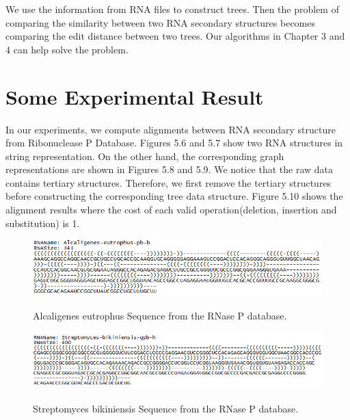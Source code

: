 We use the information from RNA files to construct trees. Then the problem of comparing the similarity between two RNA secondary structures becomes comparing the edit distance between two trees. Our algorithms in Chapter 3 and 4 can help solve the problem. 

\section{Some Experimental Result}
In our experiments, we compute alignments between RNA secondary structure from Ribonuclease P Database. Figures 5.6 and 5.7 show two RNA structures in string representation. On the other hand, the corresponding graph representations are shown in Figures 5.8 and 5.9. We notice that the raw data contains tertiary structures. Therefore, we first remove the tertiary structures before constructing the corresponding tree data structure. Figure 5.10 shows  the alignment results where the cost of each valid operation(deletion, insertion and substitution) is 1.

\begin{figure}
		\centering
		\includegraphics[width=17cm,clip]{Figures/AlcaligenesString}
		\label{Alcaligenes eutrophus Sequence from the RNase P database.} 
		\caption{Alcaligenes eutrophus Sequence from the RNase P database.}
\end{figure}

\begin{figure}
		\centering
		\includegraphics[width=17cm,clip]{Figures/StreptomycesString}
		\label{Streptomyces bikiniensis Sequence from the Rnase P database.} 
		\caption{Streptomyces bikiniensis Sequence from the RNase P database. }
\end{figure} 


